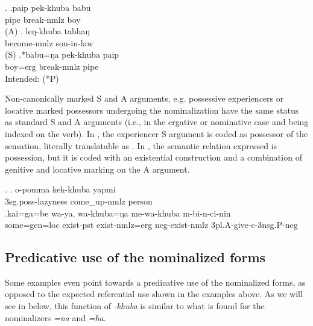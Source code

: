 \ex. \ag.paip pek-khuba babu\\
	pipe break-{\sc nmlz} boy\\
	 (A)
	\bg. leŋ-khuba tabhaŋ\\
	become{\sc -nmlz} son-in-law\\
	 (S)
	 \bg.*babu=ŋa pek-khuba paip\\ 
	boy{\sc =erg} break-{\sc nmlz} pipe		\\ 
	Intended:  (*P)
	
 
Non-canonically marked S and A arguments, e.g. possessive experiencers or locative marked possessors undergoing the nominalization have the same status as standard S and A arguments (i.e., in the ergative or nominative case and being indexed on the verb). In  \Next[a], the experiencer S argument is coded as possessor of the sensation, literally translatable as . In \Next[b], the semantic relation expressed is possession, but it is coded with an existential construction and a combination of genitive and locative marking on the A argument.


\ex. \ag. o-pomma kek-khuba yapmi\\
	{\sc 3sg.poss}-lazyness come\_up-{\sc nmlz} person	\\
\bg.kai=ga=be  wa-ya, wa-khuba=ŋa   me-wa-khuba    m-bi-n-ci-nin\\
		some{\sc =gen=loc} exist{\sc [3sg]-pst}  exist-{\sc nmlz=erg} {\sc neg}-exist-{\sc nmlz} {\sc 3pl.A}-give{\sc [pst]-c-3nsg.P-neg}	\\
	 

	
\subsection{Predicative use of the nominalized forms}
	
Some examples even point towards a predicative use of the nominalized forms, as opposed to the expected referential use shown in the examples above. As we will see in  below, this function of \emph{-khuba} is similar to what is found for the nominalizers \emph{=na} and \emph{=ha}.

